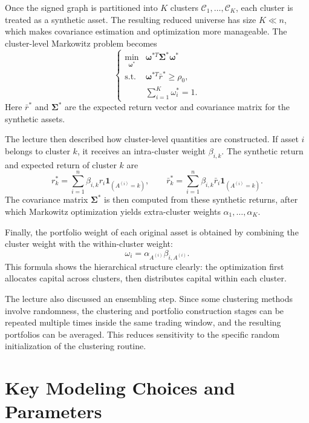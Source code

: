 \documentclass[11pt]{article}
\begin{document}
Once the signed graph is partitioned into $K$ clusters $\mathcal{C}_1,\ldots,\mathcal{C}_K$, each cluster is treated as a synthetic asset. The resulting reduced universe has size $K \ll n$, which makes covariance estimation and optimization more manageable. The cluster-level Markowitz problem becomes
\begin{equation*}
\left\{
\begin{array}{ll}
\underset{\boldsymbol{\omega}^{*}}{\min} & \boldsymbol{\omega}^{*T}\boldsymbol{\Sigma}^{*}\boldsymbol{\omega}^{*} \\
\text{s.t.} & \boldsymbol{\omega}^{*T}\bar{r}^{*} \geq \rho_0, \\
& \sum_{i=1}^{K} \omega_i^{*} = 1.
\end{array}
\right.
\end{equation*}
Here $\bar{r}^{*}$ and $\boldsymbol{\Sigma}^{*}$ are the expected return vector and covariance matrix for the synthetic assets.

The lecture then described how cluster-level quantities are constructed. If asset $i$ belongs to cluster $k$, it receives an intra-cluster weight $\beta_{i,k}$. The synthetic return and expected return of cluster $k$ are
\begin{equation*}
r_k^{*} = \sum_{i=1}^{n}\beta_{i,k} r_i \mathbf{1}_{(A^{(i)}=k)},
\qquad
\bar{r}_k^{*} = \sum_{i=1}^{n}\beta_{i,k} \bar{r}_i \mathbf{1}_{(A^{(i)}=k)}.
\end{equation*}
The covariance matrix $\boldsymbol{\Sigma}^{*}$ is then computed from these synthetic returns, after which Markowitz optimization yields extra-cluster weights $\alpha_1,\ldots,\alpha_K$.

Finally, the portfolio weight of each original asset is obtained by combining the cluster weight with the within-cluster weight:
\begin{equation*}
\omega_i = \alpha_{A^{(i)}} \beta_{i,A^{(i)}}.
\end{equation*}
This formula shows the hierarchical structure clearly: the optimization first allocates capital across clusters, then distributes capital within each cluster.

The lecture also discussed an ensembling step. Since some clustering methods involve randomness, the clustering and portfolio construction stages can be repeated multiple times inside the same trading window, and the resulting portfolios can be averaged. This reduces sensitivity to the specific random initialization of the clustering routine.

\section{Key Modeling Choices and Parameters}
\end{document}
